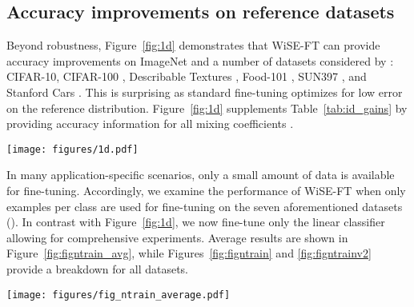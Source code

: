 \subsection{Accuracy improvements on reference datasets}
\label{sec:low-data}
Beyond robustness, Figure~\ref{fig:1d} demonstrates that WiSE-FT can provide accuracy improvements on ImageNet and a number of datasets considered by \citet{kornblith2019better}: CIFAR-10, CIFAR-100 \cite{krizhevsky2009learning}, Describable Textures \cite{dtd}, Food-101 \cite{food101}, SUN397 \cite{sun397}, and Stanford Cars \cite{cars}.
This is surprising as standard fine-tuning optimizes for low error on the reference distribution.
Figure~\ref{fig:1d} supplements Table~\ref{tab:id_gains} by providing accuracy information for all mixing coefficients .

\begin{figure*}
    \centering
    \texttt{[image: figures/1d.pdf]}
    \caption{The accuracy of WiSE-FT (end-to-end) with mixing coefficient  on ImageNet and a number of datasets considered by \citet{kornblith2019better}: CIFAR-10, CIFAR-100 \cite{krizhevsky2009learning}, Describable Textures \cite{dtd}, Food-101 \cite{food101}, SUN397 \cite{sun397}, and Stanford Cars \cite{cars}.}
    \label{fig:1d}
\end{figure*}

In many application-specific scenarios, only a small amount of data is available for fine-tuning.
Accordingly, we examine the performance of WiSE-FT when only  examples per class are used for fine-tuning on the seven aforementioned datasets (). In contrast with Figure~\ref{fig:1d}, we now fine-tune only the linear classifier allowing for comprehensive experiments. 
Average results are shown in Figure~\ref{fig:figntrain_avg}, while Figures~\ref{fig:figntrain} and \ref{fig:figntrainv2} provide a breakdown for all datasets.


\begin{figure*}
    \centering
    \texttt{[image: figures/fig\_ntrain\_average.pdf]}
    \caption{WiSE-FT can improve accuracy over the linear classifier and zero-shot model in the low data regime. On the -axis we consider  examples per class for fine-tuning. On the -axis we display accuracy improvements of WiSE-FT averaged over seven datasets \cite{deng2009imagenet,krizhevsky2009learning,dtd,food101,sun397,cars}. For , the zero-shot model outperforms the fine-tuned linear classifier, and ensembles closer to the zero-shot model (small ) yield high performance. When more data is available, the reverse is true, and higher values of  improve performance. Figures \ref{fig:figntrain} and \ref{fig:figntrainv2} display a breakdown for all datasets.}
    \label{fig:figntrain_avg}
\end{figure*}

